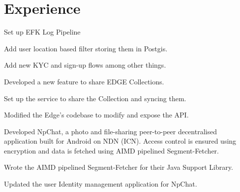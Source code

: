 \documentclass[letterpaper]{deedy-resume} %
\begin{document}
\begin{minipage}[t]{0.66\textwidth} %


\section{Experience}


\vspace{\topsep} %
\begin{tightitemize}
\item Set up EFK Log Pipeline
\item Add user location based filter storing them in Postgis.
\item Add new KYC and sign-up flows among other things.
\end{tightitemize}

\sectionspace %


\begin{tightitemize}
\item Developed a new feature to share EDGE Collections.
\item Set up the service to share the Collection and syncing them.
\item Modified the Edge's codebase to modify and expose the API.
\end{tightitemize}

\sectionspace %

\begin{tightitemize}
\item Developed NpChat, a photo and ﬁle-sharing peer-to-peer decentralised application built for Android on NDN (ICN). Access control is ensured using encryption and data is fetched using AIMD pipelined Segment-Fetcher.
\item Wrote the AIMD pipelined Segment-Fetcher for their Java Support Library.
\item Updated the user Identity management application for NpChat.
\end{tightitemize}


\end{minipage}
\end{document}
